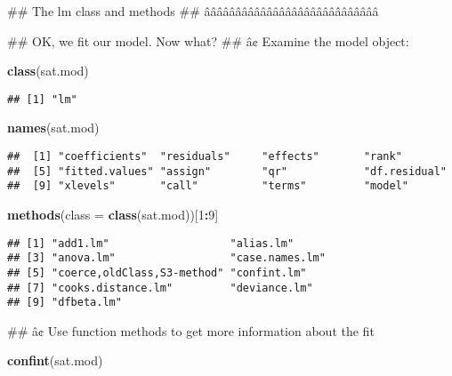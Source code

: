 \documentclass[]{article}
\newenvironment{Shaded}{\begin{snugshade}}{\end{snugshade}}
\newcommand{\KeywordTok}[1]{\textcolor[rgb]{0.13,0.29,0.53}{\textbf{#1}}}
\newcommand{\DataTypeTok}[1]{\textcolor[rgb]{0.13,0.29,0.53}{#1}}
\newcommand{\DecValTok}[1]{\textcolor[rgb]{0.00,0.00,0.81}{#1}}
\newcommand{\OperatorTok}[1]{\textcolor[rgb]{0.81,0.36,0.00}{\textbf{#1}}}
\newcommand{\NormalTok}[1]{#1}
\begin{document}
\begin{Shaded}
\begin{Highlighting}[]
\NormalTok{## The lm class and methods}
\NormalTok{## ââââââââââââââââââââââââââââ}

\NormalTok{##   OK, we fit our model. Now what?}
\NormalTok{##   â¢ Examine the model object:}

\KeywordTok{class}\NormalTok{(sat.mod)}
\end{Highlighting}
\end{Shaded}

\begin{verbatim}
## [1] "lm"
\end{verbatim}

\begin{Shaded}
\begin{Highlighting}[]
\KeywordTok{names}\NormalTok{(sat.mod)}
\end{Highlighting}
\end{Shaded}

\begin{verbatim}
##  [1] "coefficients"  "residuals"     "effects"       "rank"         
##  [5] "fitted.values" "assign"        "qr"            "df.residual"  
##  [9] "xlevels"       "call"          "terms"         "model"
\end{verbatim}

\begin{Shaded}
\begin{Highlighting}[]
\KeywordTok{methods}\NormalTok{(}\DataTypeTok{class =} \KeywordTok{class}\NormalTok{(sat.mod))[}\DecValTok{1}\OperatorTok{:}\DecValTok{9}\NormalTok{]}
\end{Highlighting}
\end{Shaded}

\begin{verbatim}
## [1] "add1.lm"                   "alias.lm"                 
## [3] "anova.lm"                  "case.names.lm"            
## [5] "coerce,oldClass,S3-method" "confint.lm"               
## [7] "cooks.distance.lm"         "deviance.lm"              
## [9] "dfbeta.lm"
\end{verbatim}

\begin{Shaded}
\begin{Highlighting}[]
\NormalTok{##   â¢ Use function methods to get more information about the fit}

\KeywordTok{confint}\NormalTok{(sat.mod)}
\end{Highlighting}
\end{Shaded}
\end{document}
